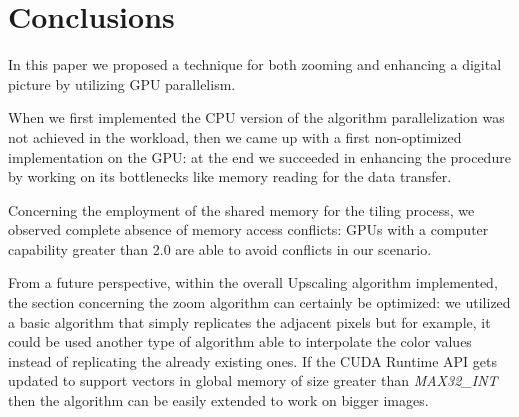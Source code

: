 \section{Conclusions}

In this paper we proposed a technique for both zooming and enhancing a digital picture by utilizing GPU parallelism.

When we first implemented the CPU version of the algorithm parallelization was not achieved in the workload, then
we came up with a first non-optimized implementation on the GPU: at the end we succeeded in enhancing the procedure by working on its bottlenecks 
like memory reading for the data transfer.

Concerning the employment of the shared memory for the tiling process, we observed complete absence of memory access conflicts: 
GPUs with a computer capability greater than 2.0 are able to avoid conflicts in our scenario. 

From a future perspective, within the overall Upscaling algorithm implemented, the section concerning the zoom algorithm can certainly be optimized: 
we utilized a basic algorithm that simply replicates the adjacent pixels but for example, 
it could be used another type of algorithm able to interpolate the color values instead of replicating the already existing ones.
If the CUDA Runtime API gets updated to support vectors in global memory of size greater than \textit{MAX32\_INT} 
then the algorithm can be easily extended to work on bigger images.



